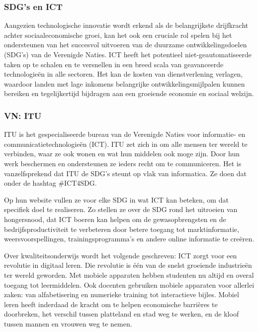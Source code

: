 \subsubsection{SDG's en ICT}
Aangezien technologische innovatie wordt erkend als de belangrijkste drijfkracht achter sociaaleconomische groei, kan het ook een cruciale rol spelen bij het ondersteunen van het succesvol uitvoeren van de duurzame ontwikkelingsdoelen (SDG's) van de Verenigde Naties. ICT heeft het potentieel niet-geautomatiseerde taken op te schalen en te versnellen in een breed scala van geavanceerde technologieën in alle sectoren. Het kan de kosten van dienstverlening verlagen, waardoor landen met lage inkomens belangrijke ontwikkelingsmijlpalen kunnen bereiken en tegelijkertijd bijdragen aan een groeiende economie en sociaal welzijn. \autocite{Ameyed2018}

\subsubsection{VN: ITU}
ITU is het gespecialiseerde bureau van de Verenigde Naties voor informatie- en communicatietechnologieën (ICT). ITU zet zich in om alle mensen ter wereld te verbinden, waar ze ook wonen en wat hun middelen ook moge zijn. Door hun werk beschermen en ondersteunen ze ieders recht om te communiceren.
Het is vanzelfsprekend dat ITU de SDG's steunt op vlak van informatica. Ze doen dat onder de hashtag \#ICT4SDG. \autocite{ITU2015}

Op hun website vullen ze voor elke SDG in wat ICT kan beteken, om dat specifiek doel te realiseren. Zo stellen ze over de SDG rond het uitroeien van hongersnood, dat ICT boeren kan helpen om de gewasopbrengsten en de bedrijfsproductiviteit te verbeteren door betere toegang tot marktinformatie, weersvoorspellingen, trainingsprogramma's en andere online informatie te creëren. \autocite{ITU2015}

Over kwaliteitsonderwijs wordt het volgende geschreven: ICT zorgt voor een revolutie in digitaal leren. Die revolutie is één van de snelst groeiende industrieën ter wereld geworden. Met mobiele apparaten hebben studenten nu altijd en overal toegang tot leermiddelen. Ook docenten gebruiken mobiele apparaten voor allerlei zaken: van alfabetisering en numerieke training tot interactieve bijles. Mobiel leren heeft inderdaad de kracht om te helpen economische barrières te doorbreken, het verschil tussen platteland en stad weg te werken, en de kloof tussen mannen en vrouwen weg te nemen. \autocite{ITU2015}

